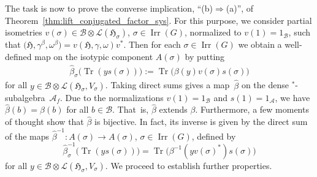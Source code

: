 \documentclass[10pt,a4paper]{amsart}
\numberwithin{equation}{section}
\newcommand*{\tensor}{\otimes}		%
\DeclareMathOperator{\Tr}{Tr}		%
\newcommand*{\Star}{$^*$\nobreakdash}
\newcommand*{\hilb}{\mathfrak}		%
\newcommand*{\alg}{\mathcal}		%
\newcommand*{\hH}{\hilb{H}}			%
\newcommand*{\one}{1}				%
\newcommand*{\aA}{\alg{A}}			%
\newcommand*{\aB}{\alg{B}} 			%
\newcommand*{\End}{\mathcal{L}} %
\DeclareMathOperator{\Irrep}{Irr} 			%
\begin{document}
The task is now to prove the converse implication, ``(b)$\Rightarrow$(a)'', of Theorem~\ref{thm:lift_conjugated_factor_sys}.
For this purpose, we consider partial isometries $v(\sigma) \in \aB \tensor \End(\hH_\sigma)$, $\sigma \in \Irrep(G)$, normalized to $v(1) = \one_\aB$, such that $ \big(\hH, \gamma^\beta, \omega^\beta\big) = v (\hH, \gamma, \omega) v^*$.
Then for each $\sigma \in \Irrep(G)$ we obtain a well-defined map on the isotypic component $A(\sigma)$ by putting
\begin{gather}\label{eq:beta}
	\hat\beta_\sigma \bigl( \Tr (y s(\sigma)) \bigr) := \Tr \bigl( \beta(y) v(\sigma) s(\sigma) \bigr)
\end{gather}
for all $y\in \aB \tensor \End(\hH_\sigma, V_\sigma)$.
Taking direct sums gives a map~$\hat\beta$ on the dense \Star-subalgebra~$\aA_f$.
Due to the normalizations $v(1) = \one_\aB$ and $s(1) = \one_\aA$, we have $\hat \beta(b) = \beta(b)$ for all $b \in \aB$.
That~is, $\hat \beta$ extends $\beta$.
Furthermore, a few moments of thought show that $\hat \beta$ is bijective.
In fact, its inverse is given by the direct sum of the maps $\hat\beta^{-1}\colon A(\sigma) \to A(\sigma)$, $\sigma \in \Irrep(G)$, defined by
\[
\hat\beta^{-1}_\sigma \bigl(\Tr ( y s(\sigma)) \bigr)
	= \Tr \bigl( \beta^{-1} (y v(\sigma)^*) s(\sigma) \bigr)
\] for all $y \in \aB \tensor \End(\hH_\sigma, V_\sigma)$.
We proceed to establish further properties.
\end{document}
